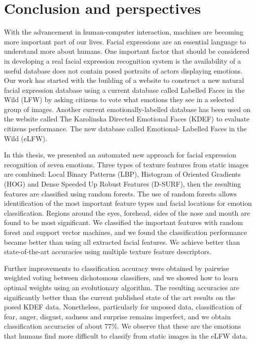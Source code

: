 \chapter{Conclusion and perspectives}

With the advancement in human-computer interaction, machines are becoming more important part of our lives. Facial expressions are an essential language to understand more about humans.
One important factor that should be considered in developing a real facial expression recognition system is the availability of a useful database does not contain posed portraits of actors displaying emotions. Our work has started with the building of a website to construct a new natural facial expression database using a current database called  Labelled Faces in the Wild (LFW) by asking citizens to vote what emotions they see in a selected group of images. Another current emotionally-labelled database has been used on the website called The Karolinska Directed Emotional Faces (KDEF) to evaluate citizens performance. The new database called Emotional- Labelled Faces in the Wild (eLFW). 


In this thesis, we presented an automated new approach for facial expression recognition of seven emotions.  Three types of texture features from static images are combined: Local Binary Patterns (LBP), Histogram of Oriented Gradients (HOG) and Dense Speeded Up Robust Features (D-SURF), then the resulting features are classified using random forests. The use of random forests allows identification of the most important feature types and facial locations for emotion classification. Regions around the eyes, forehead, sides of the nose and mouth are found to be most significant. We classified the important features with random forest and support vector machines, and we found the classification performance became better than using all extracted facial features. We achieve better than state-of-the-art accuracies using multiple texture feature descriptors. 


Further improvements to classification accuracy were obtained by pairwise weighted voting between dichotomous classifiers, and we showed how to learn optimal weights using an evolutionary algorithm.  The resulting accuracies are significantly better than the current published state of the art results on the posed KDEF data. Nonetheless, particularly for unposed data, classification of fear, anger, disgust, sadness and surprise remains imperfect, and we obtain classification accuracies of about 77\%. We observe that these are the emotions that humans find more difficult to classify from static images in the eLFW data.

